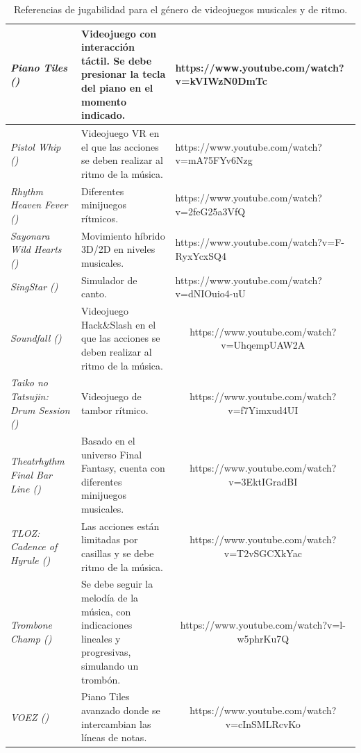 \begin{table}[htbp]
{\begin{tabular}{|l||l||c|}
		\hline
		\textit{Piano Tiles (\cite{PIANOTILES:2014})} & Videojuego con interacción táctil. Se debe presionar la tecla del piano en el momento indicado. & \multicolumn{1}{l|}{\textcolor[rgb]{ .02,  .388,  .757}{https://www.youtube.com/watch?v=kVIWzN0DmTc}} \\
		\hline
		\textit{Pistol Whip (\cite{PISTOLWHIP:2019})} & Videojuego VR en el que las acciones se deben realizar al ritmo de la música. & \multicolumn{1}{l|}{\textcolor[rgb]{ .02,  .388,  .757}{https://www.youtube.com/watch?v=mA75FYv6Nzg}} \\
		\hline
		\textit{Rhythm Heaven Fever (\cite{RHF:2011})} & Diferentes minijuegos rítmicos. & \multicolumn{1}{l|}{\textcolor[rgb]{ .02,  .388,  .757}{https://www.youtube.com/watch?v=2feG25a3VfQ}} \\
		\hline
		\textit{Sayonara Wild Hearts (\cite{SWH:2019})} & Movimiento híbrido 3D/2D en niveles musicales. & \multicolumn{1}{l|}{\textcolor[rgb]{ .02,  .388,  .757}{https://www.youtube.com/watch?v=F-RyxYcxSQ4}} \\
		\hline
		\textit{SingStar (\cite{SINGSTAR:2004})} & Simulador de canto. & \multicolumn{1}{l|}{\textcolor[rgb]{ .02,  .388,  .757}{https://www.youtube.com/watch?v=dNIOuio4-uU}} \\
		\hline
		\textit{Soundfall (\cite{SOUNDFALL:2022})} & Videojuego Hack\&Slash en el que las acciones se deben realizar al ritmo de la música. & \textcolor[rgb]{ .02,  .388,  .757}{https://www.youtube.com/watch?v=UhqempUAW2A} \\
		\hline
		\textit{Taiko no Tatsujin: Drum Session (\cite{TNTDS:2017})} & Videojuego de tambor rítmico. & \textcolor[rgb]{ .02,  .388,  .757}{https://www.youtube.com/watch?v=f7Yimxud4UI} \\
		\hline
		\textit{Theatrhythm Final Bar Line (\cite{TFBL:2023})} & Basado en el universo Final Fantasy, cuenta con diferentes minijuegos musicales. & \textcolor[rgb]{ .02,  .388,  .757}{https://www.youtube.com/watch?v=3EktIGradBI} \\
		\hline
		\textit{TLOZ: Cadence of Hyrule (\cite{TLOZCOH:2019})} & Las acciones están limitadas por casillas y se debe ritmo de la música. & \textcolor[rgb]{ .02,  .388,  .757}{https://www.youtube.com/watch?v=T2vSGCXkYac} \\
		\hline
		\textit{Trombone Champ (\cite{TROMBONECHAMP:2022})} & Se debe seguir la melodía de la música, con indicaciones lineales y progresivas, simulando un trombón. & \textcolor[rgb]{ .02,  .388,  .757}{https://www.youtube.com/watch?v=l-w5phrKu7Q} \\
		\hline
		\textit{VOEZ (\cite{VOEZ:2016})} & Piano Tiles avanzado donde se intercambian las líneas de notas. & \textcolor[rgb]{ .02,  .388,  .757}{https://www.youtube.com/watch?v=cInSMLRcvKo} \\
		\hline
	\end{tabular}
}
	\caption{Referencias de jugabilidad para el género de videojuegos musicales y de ritmo.}
	\label{tab:RhythmReferences}
	\vspace{-15pt}
\end{table}


